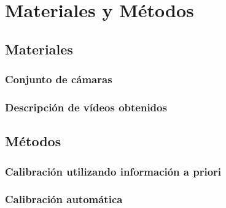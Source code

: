 \chapter{Materiales y Métodos}
\section{Materiales}
\subsection{Conjunto de cámaras} 
\subsection{Descripción de vídeos obtenidos}
\section{Métodos}
\subsection{Calibración utilizando información a priori}
\subsection{Calibración automática}

